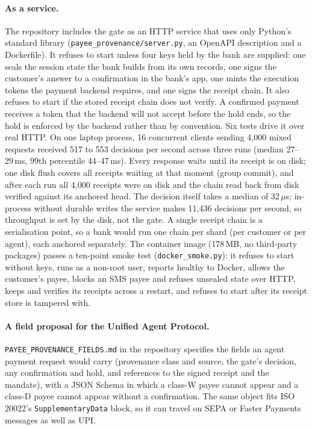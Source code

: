 \documentclass[10pt,a4paper]{article}
\begin{document}
\paragraph{As a service.} The repository includes the gate as an HTTP service that uses only Python's standard library
(\texttt{payee\_provenance/server.py}, an OpenAPI description and a Dockerfile). It refuses to start unless four keys
held by the bank are supplied: one seals the session state the bank builds from its own records, one signs the customer's
answer to a confirmation in the bank's app, one mints the execution tokens the payment backend requires, and one signs
the receipt chain. It also refuses to start if the stored receipt chain does not verify. A confirmed payment receives a
token that the backend will not accept before the hold ends, so the hold is enforced by the backend rather than by
convention. Six tests drive it over real HTTP. On one laptop process, 16 concurrent clients sending 4,000 mixed requests
received 517 to 553 decisions per second across three runs (median 27--29\,ms, 99th percentile 44--47\,ms). Every
response waits until its receipt is on disk; one disk flush covers all receipts waiting at that moment (group commit),
and after each run all 4,000 receipts were on disk and the chain read back from disk verified against its anchored head.
The decision itself takes a median of 32\,$\mu$s; in-process without durable writes the service makes 11,436
decisions per second, so throughput is set by the disk, not the gate. A single receipt chain is a serialisation point,
so a bank would run one chain per shard (per customer or per agent), each anchored separately. The container image
(178\,MB, no third-party packages) passes a ten-point smoke test (\texttt{docker\_smoke.py}): it refuses to start without
keys, runs as a non-root user, reports healthy to Docker, allows the customer's payee, blocks an SMS payee and refuses
unsealed state over HTTP, keeps and verifies its receipts across a restart, and refuses to start after its receipt store
is tampered with.

\paragraph{A field proposal for the Unified Agent Protocol.} \texttt{PAYEE\_PROVENANCE\_FIELDS.md} in the repository
specifies the fields an agent payment request would carry (provenance class and source, the gate's decision, any
confirmation and hold, and references to the signed receipt and the mandate), with a JSON Schema in which a class-W payee
cannot appear and a class-D payee cannot appear without a confirmation. The same object fits ISO 20022's
\texttt{SupplementaryData} block, so it can travel on SEPA or Faster Payments messages as well as UPI.
\end{document}
